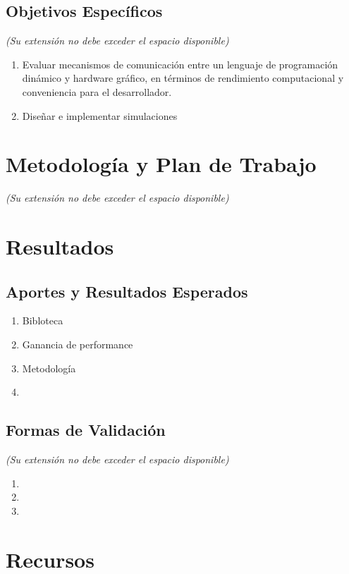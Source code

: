 \documentclass[11pt,spanish]{article}
\begin{document}
\subsection{Objetivos Específicos}
\emph{(Su extensión no debe exceder el espacio disponible) }

\begin{enumerate}
   \item Evaluar mecanismos de comunicación entre un lenguaje de programación
       dinámico y hardware gráfico, en términos de rendimiento computacional y
       conveniencia para el desarrollador.
   \item Diseñar e implementar simulaciones
\end{enumerate}

\section{Metodología y Plan de Trabajo}
\emph{(Su extensión no debe exceder el espacio disponible)}

 
\section{Resultados}

\subsection{Aportes y Resultados Esperados}

\begin{enumerate}
    \item Bibloteca
    \item Ganancia de performance
    \item Metodología
    \item 
\end{enumerate}
 

\subsection{Formas de Validación}

\emph{(Su extensión no debe exceder el espacio disponible)}

\begin{enumerate}
    \item
    \item
    \item
\end{enumerate}
 

\section{Recursos}
\end{document}
